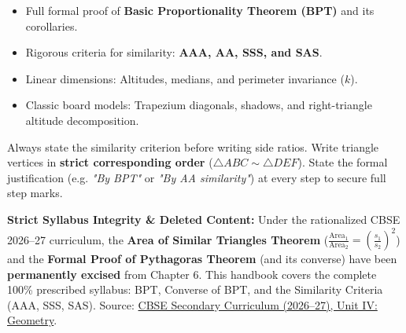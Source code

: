 \documentclass[10pt,a4paper]{article}
\begin{document}
\vspace{3mm}
\begin{minipage}[t]{0.48\textwidth}
  \begin{conceptBox}[title=What this handbook includes,fonttitle=\bfseries\color{navy}]
    \begin{itemize}
      \item Full formal proof of \textbf{Basic Proportionality Theorem (BPT)} and its corollaries.
      \item Rigorous criteria for similarity: \textbf{AAA, AA, SSS, and SAS}.
      \item Linear dimensions: Altitudes, medians, and perimeter invariance ($k$).
      \item Classic board models: Trapezium diagonals, shadows, and right-triangle altitude decomposition.
    \end{itemize}
  \end{conceptBox}
\end{minipage}\hfill
\begin{minipage}[t]{0.48\textwidth}
  \begin{formulaBox}[title=How to use this handbook,fonttitle=\bfseries\color{navy}]
    \raggedright Always state the similarity criterion before writing side ratios. Write triangle vertices in \textbf{strict corresponding order} ($\triangle ABC \sim \triangle DEF$). State the formal justification (e.g. \textit{"By BPT"} or \textit{"By AA similarity"}) at every step to secure full step marks.
  \end{formulaBox}
\end{minipage}

\vspace{1.5mm}
\begin{warningBox}[title=Official CBSE Curriculum Scope (Academic Year 2026--27),fonttitle=\bfseries\color{navy}]
  \textbf{Strict Syllabus Integrity \& Deleted Content:}
  Under the rationalized CBSE 2026--27 curriculum, the \textbf{Area of Similar Triangles Theorem} ($\frac{\text{Area}_1}{\text{Area}_2} = (\frac{s_1}{s_2})^2$) and the \textbf{Formal Proof of Pythagoras Theorem} (and its converse) have been \textbf{permanently excised} from Chapter 6. This handbook covers the complete 100\% prescribed syllabus: BPT, Converse of BPT, and the Similarity Criteria (AAA, SSS, SAS).
  {\scriptsize Source: \href{https://cbseacademic.nic.in/web_material/CurriculumMain27/SecPart1/Maths_SecP1X_2026-27.pdf}{CBSE Secondary Curriculum (2026--27), Unit IV: Geometry}.}
\end{warningBox}
\end{document}
